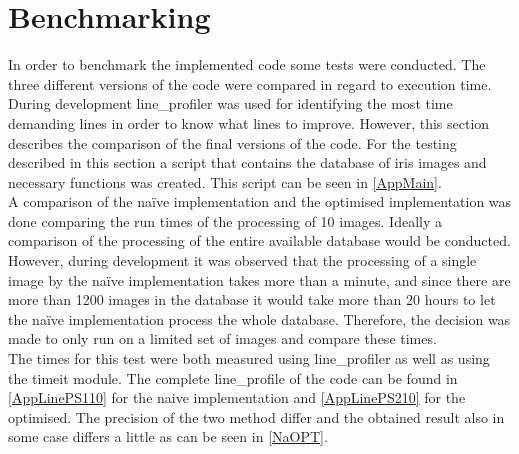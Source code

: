 \section{Benchmarking}
In order to benchmark the implemented code some tests were conducted. The three different versions of the code were compared in regard to execution time. During development line_profiler was used for identifying the most time demanding lines in order to know what lines to improve. However, this section describes the comparison of the final versions of the code. For the testing described in this section a script that contains the database of iris images and necessary functions was created. This script can be seen in \autoref{AppMain}. \\
A comparison of the na\"ive implementation and the optimised implementation was done comparing the run times of the processing of 10 images. Ideally a comparison of the processing of the entire available database would be conducted. However, during development it was observed that the processing of a single image by the na\"ive implementation takes more than a minute, and since there are more than 1200 images in the database it would take more than 20 hours to let the na\"ive implementation process the whole database. Therefore, the decision was made to only run on a limited set of images and compare these times. \\
The times for this test were both measured using line_profiler as well as using the timeit module. The complete line_profile of the code can be found in \autoref{AppLinePS110} for the naive implementation and \autoref{AppLinePS210} for the optimised.  The precision of the two method differ and the obtained result also in some case differs a little as can be seen in \autoref{NaOPT}.  


